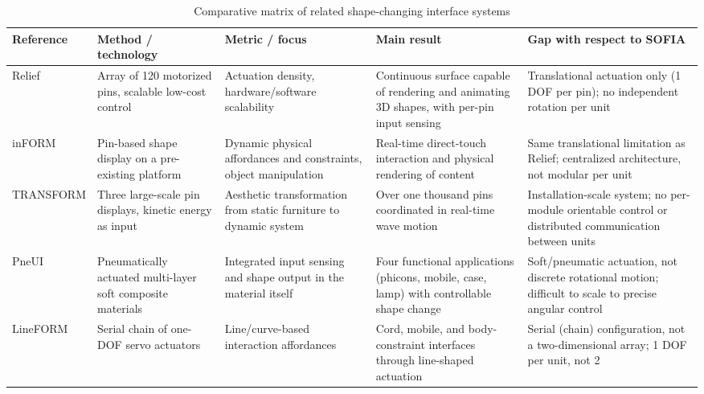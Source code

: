 \documentclass[lettersize,journal]{IEEEtran}
\begin{document}
	\begin{table}[!t]
		\centering
		\caption{Comparative matrix of related shape-changing interface systems}
		\label{tab:related_work_matrix}
		\scriptsize
		
		\setlength{\tabcolsep}{3pt}
		\renewcommand{\arraystretch}{1.1}
		
		\begin{tabularx}{\textwidth}
			{@{}P{2.2cm} P{3cm} P{3cm} P{4cm} Y@{}}
			
			\toprule
			Reference & Method / technology & Metric / focus & Main result & Gap with respect to SOFIA \\
			\midrule
			
			Relief \cite{leithinger2010relief} &
			Array of 120 motorized pins, scalable low-cost control &
			Actuation density, hardware/software scalability &
			Continuous surface capable of rendering and animating 3D shapes, with per-pin input sensing &
			Translational actuation only (1 DOF per pin); no independent rotation per unit \\
			
			inFORM \cite{follmer2013inform} &
			Pin-based shape display on a pre-existing platform &
			Dynamic physical affordances and constraints, object manipulation &
			Real-time direct-touch interaction and physical rendering of content &
			Same translational limitation as Relief; centralized architecture, not modular per unit \\
			
			TRANSFORM \cite{ishii2015transform} &
			Three large-scale pin displays, kinetic energy as input &
			Aesthetic transformation from static furniture to dynamic system &
			Over one thousand pins coordinated in real-time wave motion &
			Installation-scale system; no per-module orientable control or distributed communication between units \\
			
			PneUI \cite{yao2013pneui} &
			Pneumatically actuated multi-layer soft composite materials &
			Integrated input sensing and shape output in the material itself &
			Four functional applications (phicons, mobile, case, lamp) with controllable shape change &
			Soft/pneumatic actuation, not discrete rotational motion; difficult to scale to precise angular control \\
			
			LineFORM \cite{nakagaki2015lineform} &
			Serial chain of one-DOF servo actuators &
			Line/curve-based interaction affordances &
			Cord, mobile, and body-constraint interfaces through line-shaped actuation &
			Serial (chain) configuration, not a two-dimensional array; 1 DOF per unit, not 2 \\
			

\end{tabularx}
\end{table}
\end{document}
